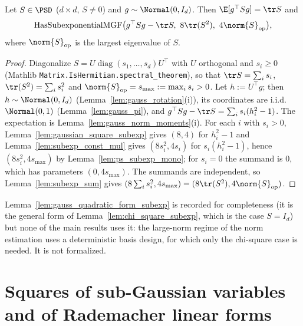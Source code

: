 \begin{lemma}\label{lem:gauss_quadratic_form_subexp}
Let $S \in \PSD$ ($d\times d$, $S \ne 0$) and $g \sim \Normal(0,I_d)$. Then
$\E[g^\top Sg] = \tr S$ and
\[
  \mathrm{HasSubexponentialMGF}\big(g^\top Sg - \tr S,\ 8\tr(S^2),\ 4\norm{S}_{\mathrm{op}}\big),
\]
where $\norm{S}_{\mathrm{op}}$ is the largest eigenvalue of $S$.
\end{lemma}

\begin{proof}
Diagonalize $S = U\operatorname{diag}(s_1,\dots,s_d)U^\top$ with $U$ orthogonal and
$s_i \ge 0$ (Mathlib \texttt{Matrix.IsHermitian.spectral\_theorem}), so that
$\tr S = \sum_is_i$, $\tr(S^2) = \sum_is_i^2$ and $\norm{S}_{\mathrm{op}} = s_{\max} := \max_is_i > 0$.
Let $h := U^\top g$; then $h \sim \Normal(0,I_d)$ (Lemma~\ref{lem:gauss_rotation}(i)), its
coordinates are i.i.d.\ $\Normal(0,1)$ (Lemma~\ref{lem:gauss_pi}), and
$g^\top Sg - \tr S = \sum_is_i(h_i^2 - 1)$. The expectation is
Lemma~\ref{lem:gauss_norm_moments}(i). For each $i$ with $s_i > 0$,
Lemma~\ref{lem:gaussian_square_subexp} gives $(8,4)$ for $h_i^2 - 1$ and
Lemma~\ref{lem:subexp_const_mul} gives $(8s_i^2, 4s_i)$ for $s_i(h_i^2-1)$, hence
$(8s_i^2, 4s_{\max})$ by Lemma~\ref{lem:ps_subexp_mono}; for $s_i = 0$ the summand is $0$,
which has parameters $(0, 4s_{\max})$. The summands are independent, so
Lemma~\ref{lem:subexp_sum} gives $(8\sum_is_i^2, 4s_{\max}) = (8\tr(S^2), 4\norm{S}_{\mathrm{op}})$.
\end{proof}

\begin{remark}\label{rem:ps_quadratic_form_unused}
Lemma~\ref{lem:gauss_quadratic_form_subexp} is recorded for completeness (it is the general
form of Lemma~\ref{lem:chi_square_subexp}, which is the case $S = I_d$) but none of the main
results uses it: the large-norm regime of the norm estimation uses a deterministic basis
design, for which only the chi-square case is needed. It is not formalized.
\end{remark}

\section{Squares of sub-Gaussian variables and of Rademacher linear forms}
\label{sec:pre_subexp_rademacher}

